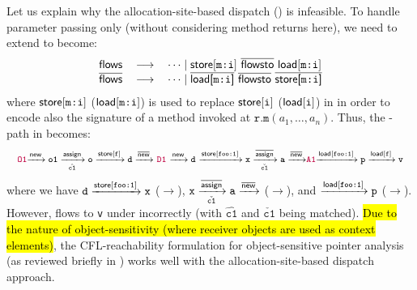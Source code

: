 Let us explain why the allocation-site-based dispatch () is infeasible.
To handle parameter passing only (without considering method returns here), we need to extend \manuLF to become:
\begin{equation} 
\label{eqn:newFlows}
\begin{tabular}{rcl} 
$\flows$ & $\longrightarrow$ & $\cdots \mid \store[\texttt{m:i}]\ \iflowsto\ \load[\texttt{m:i}]$\\
$\iflows$ & $\longrightarrow$ &  $\cdots \mid  \iloadfield{\texttt{m:i}} \ \iflowsto \ \istorefield{\texttt{m:i}}$
\end{tabular}
\end{equation}
where  $\textsf{store}[\texttt{m:i}]$ ($\textsf{load}[\texttt{m:i}]$) is used to replace
 $\textsf{store}[\texttt{i}]$ ($\textsf{load}[\texttt{i}]$) in   in order
 to encode also the  signature of a method invoked at 
 $\mathtt{r}.\mathtt{m}(a_1, \dots, a_n)$. Thus, the \manuLFC-path in 
becomes:
\begin{equation} 
\footnotesize
  \centering
\label{eq:alterLFPath}
\begin{tabular}{l} 
\commentfont{O1}$\xrightarrow{\new}
\texttt{o1}\xrightarrow[\hat{\mathtt{c1}}]{\assign}
\texttt{o} \xrightarrow{\store[\texttt{f}]} \texttt{d}
\xrightarrow{\inew}$ 
\commentfont{D1} 
$ \xrightarrow{\new} \texttt{d}$ $\xrightarrow{\store[\texttt{foo:1}]}\texttt{x}\xrightarrow[\check{\mathtt{c1}}]{\iassign}\texttt{a}
\xrightarrow{\inew}$\commentfont{A1}$\xrightarrow{\load[\texttt{foo:1}]}\texttt{p}
    \xrightarrow{\load[\texttt{f}]} \texttt{v}
$
\end{tabular}
\end{equation}
where we have
$\texttt{d}\xrightarrow{\textsf{store}[\texttt{foo:1}]}\texttt{x}$
(\textcolor{\colora}{$\rightarrow$}), 
$\texttt{x} \xrightarrow[\check{\mathtt{c1}}]{\overline{\textsf{assign}}}\texttt{a} \xrightarrow{\overline{\textsf{new}}}$
(\textcolor{\colorb}{$\rightarrow$}), and
$\xrightarrow{\textsf{load}[\texttt{foo:1}]}\texttt{p}$
(\textcolor{\colord}{$\rightarrow$}). However, 
  flows to \texttt{v} under \emptyctx incorrectly (with
$\hat{\texttt{c1}}$ and $\check{\texttt{c1}}$ being matched). \hl{Due to the
nature of object-sensitivity (where receiver objects are used as context elements)},
 the CFL-reachability formulation for object-sensitive pointer analysis \cite{lu2019precision, lu2021eagle} (as reviewed briefly in ) works well with the allocation-site-based dispatch approach.



